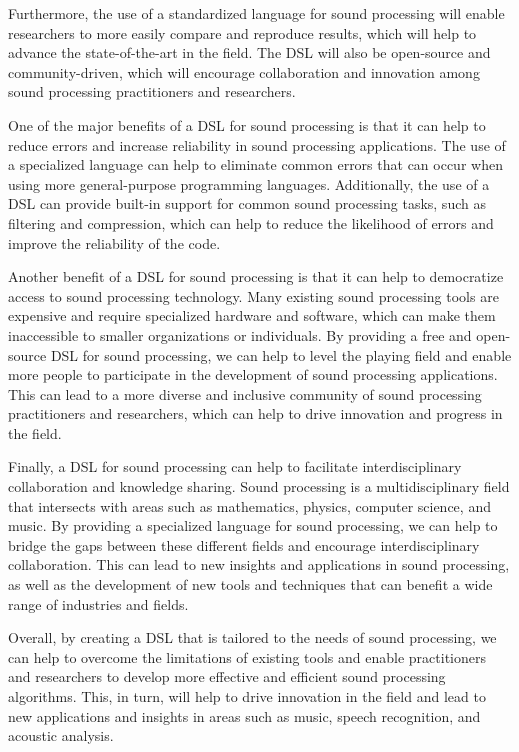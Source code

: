 Furthermore, the use of a standardized language for sound processing will enable researchers to more easily compare and reproduce results, which will help to advance the state-of-the-art in the field. The DSL will also be open-source and community-driven, which will encourage collaboration and innovation among sound processing practitioners and researchers.

One of the major benefits of a DSL for sound processing is that it can help to reduce errors and increase reliability in sound processing applications. The use of a specialized language can help to eliminate common errors that can occur when using more general-purpose programming languages. Additionally, the use of a DSL can provide built-in support for common sound processing tasks, such as filtering and compression, which can help to reduce the likelihood of errors and improve the reliability of the code.

Another benefit of a DSL for sound processing is that it can help to democratize access to sound processing technology. Many existing sound processing tools are expensive and require specialized hardware and software, which can make them inaccessible to smaller organizations or individuals. By providing a free and open-source DSL for sound processing, we can help to level the playing field and enable more people to participate in the development of sound processing applications. This can lead to a more diverse and inclusive community of sound processing practitioners and researchers, which can help to drive innovation and progress in the field.

Finally, a DSL for sound processing can help to facilitate interdisciplinary collaboration and knowledge sharing. Sound processing is a multidisciplinary field that intersects with areas such as mathematics, physics, computer science, and music. By providing a specialized language for sound processing, we can help to bridge the gaps between these different fields and encourage interdisciplinary collaboration. This can lead to new insights and applications in sound processing, as well as the development of new tools and techniques that can benefit a wide range of industries and fields.

Overall, by creating a DSL that is tailored to the needs of sound processing, we can help to overcome the limitations of existing tools and enable practitioners and researchers to develop more effective and efficient sound processing algorithms. This, in turn, will help to drive innovation in the field and lead to new applications and insights in areas such as music, speech recognition, and acoustic analysis.

